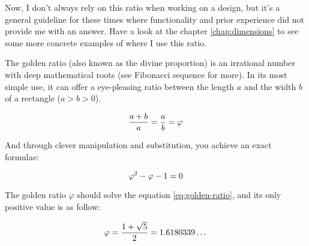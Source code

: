 Now, I don't always rely on this ratio when working on a design, but it's a general guideline for these times where functionality and prior experience did not provide me with an answer. Have a look at the chapter \ref{chap:dimensions} to see some more concrete examples of where I use this ratio.

\begin{note}
  The golden ratio (also known as the divine proportion) is an irrational number with deep mathematical roots (see Fibonacci sequence for more). In its most simple use, it can offer a eye-pleasing ratio between the length $a$ and the width $b$ of a rectangle ($a > b > 0$).

  \begin{equation}
    \centering
    \frac{a + b}{a} = \frac{a}{b}=\varphi
  \end{equation}

  And through clever manipulation and substitution, you achieve an exact formulae:

  \begin{equation}
    \centering
    \label{eq:golden-ratio}
    \varphi^2 - \varphi - 1 = 0
  \end{equation}

  The golden ratio $\varphi$ should solve the equation \ref{eq:golden-ratio}, and its only positive value is as follow:

  \begin{equation}
    \centering
    \varphi = \frac{1 + \sqrt{5}}{2} = 1.6180339\dots
  \end{equation}
\end{note}

